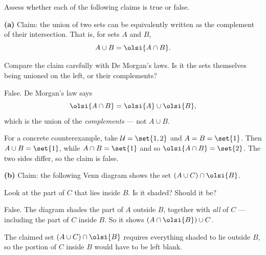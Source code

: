 \documentclass[12pt]{ximera}
\begin{document}
\begin{problem}
Assess whether each of the following claims is true or false.

\begin{prompt}
\textbf{(a)} Claim: the union of two sets can be equivalently written as the
complement of their intersection. That is, for sets $A$ and $B$,
\[ A\cup B = \olsi{A\cap B}. \]

\begin{multipleChoice}
\end{multipleChoice}

\begin{hint}
Compare the claim carefully with De Morgan's laws. Is it the sets themselves being
unioned on the left, or their complements?
\end{hint}

\begin{feedback}
False. De Morgan's law says
\[ \olsi{A\cap B} = \olsi{A}\cup\olsi{B}, \]
which is the union of the \emph{complements} --- not $A\cup B$.

For a concrete counterexample, take $\mathcal{U}=\set{1,2}$ and $A=B=\set{1}$. Then
$A\cup B=\set{1}$, while $A\cap B=\set{1}$ and so $\olsi{A\cap B}=\set{2}$. The two
sides differ, so the claim is false.
\end{feedback}
\end{prompt}

\begin{prompt}
\textbf{(b)} Claim: the following Venn diagram shows the set
$\left(A\cup C\right)\cap\olsi{B}$.

\begin{center}
\end{center}

\begin{multipleChoice}
\end{multipleChoice}

\begin{hint}
Look at the part of $C$ that lies inside $B$. Is it shaded? Should it be?
\end{hint}

\begin{feedback}
False. The diagram shades the part of $A$ outside $B$, together with \emph{all} of $C$
--- including the part of $C$ inside $B$. So it shows
$\left(A\cap\olsi{B}\right)\cup C$.

The claimed set $\left(A\cup C\right)\cap\olsi{B}$ requires everything shaded to lie
outside $B$, so the portion of $C$ inside $B$ would have to be left blank.
\end{feedback}
\end{prompt}
\end{problem}
\end{document}
